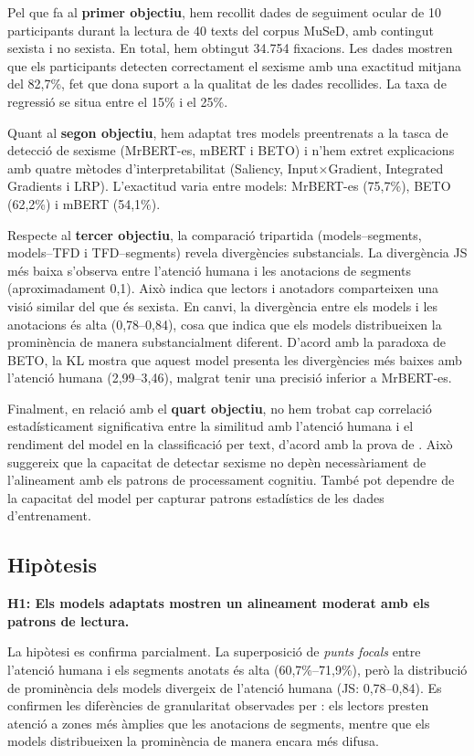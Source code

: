 Pel que fa al \textbf{primer objectiu}, hem recollit dades de seguiment ocular de 10 participants durant la lectura de 40 texts del corpus MuSeD, amb contingut sexista i no sexista. En total, hem obtingut 34.754 fixacions.
Les dades mostren que els participants detecten correctament el sexisme amb una exactitud mitjana del 82,7\%, fet que dona suport a la qualitat de les dades recollides. La taxa de regressió se situa entre el 15\% i el 25\%.

Quant al \textbf{segon objectiu}, hem adaptat tres models preentrenats a la tasca de detecció de sexisme (MrBERT-es, mBERT i BETO) i n'hem extret explicacions amb quatre mètodes d'interpretabilitat (Saliency, Input$\times$Gradient, Integrated Gradients i LRP).
L'exactitud varia entre models: MrBERT-es (75,7\%), BETO (62,2\%) i mBERT (54,1\%).

Respecte al \textbf{tercer objectiu}, la comparació tripartida (models--segments, models--TFD i TFD--segments) revela divergències substancials.
La divergència JS més baixa s'observa entre l'atenció humana i les anotacions de segments (aproximadament 0,1). Això indica que lectors i anotadors comparteixen una visió similar del que és sexista.
En canvi, la divergència entre els models i les anotacions és alta (0,78--0,84), cosa que indica que els models distribueixen la prominència de manera substancialment diferent.
D'acord amb la paradoxa de BETO, la KL mostra que aquest model presenta les divergències més baixes amb l'atenció humana (2,99--3,46), malgrat tenir una precisió inferior a MrBERT-es.

Finalment, en relació amb el \textbf{quart objectiu}, no hem trobat cap correlació estadísticament significativa entre la similitud amb l'atenció humana i el rendiment del model en la classificació per text, d'acord amb la prova de \textcite{soodInterpretingAttentionModels2020}.
Això suggereix que la capacitat de detectar sexisme no depèn necessàriament de l'alineament amb els patrons de processament cognitiu. També pot dependre de la capacitat del model per capturar patrons estadístics de les dades d'entrenament.

\subsection*{Hipòtesis}

\textbf{H1: Els models adaptats mostren un alineament moderat amb els patrons de lectura.}

\noindent La hipòtesi es confirma parcialment.
La superposició de \textit{punts focals} entre l'atenció humana i els segments anotats és alta (60,7\%--71,9\%), però la distribució de prominència dels models divergeix de l'atenció humana (JS: 0,78--0,84).
Es confirmen les diferències de granularitat observades per \textcite{bogaert_explanation_2026}: els lectors presten atenció a zones més àmplies que les anotacions de segments, mentre que els models distribueixen la prominència de manera encara més difusa.

